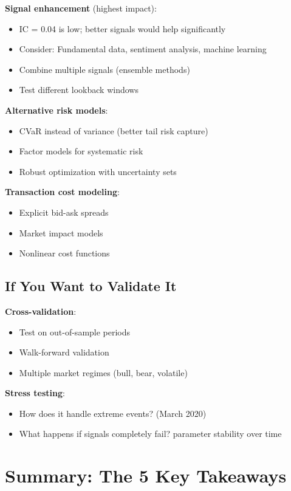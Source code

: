 \documentclass[a4paper,12pt]{article}
\begin{document}
\textbf{Signal enhancement} (highest impact):
\begin{itemize}
    \item IC = 0.04 is low; better signals would help significantly
    \item Consider: Fundamental data, sentiment analysis, machine learning
    \item Combine multiple signals (ensemble methods)
    \item Test different lookback windows
\end{itemize}

\textbf{Alternative risk models}:
\begin{itemize}
    \item CVaR instead of variance (better tail risk capture)
    \item Factor models for systematic risk
    \item Robust optimization with uncertainty sets
\end{itemize}

\textbf{Transaction cost modeling}:
\begin{itemize}
    \item Explicit bid-ask spreads
    \item Market impact models
    \item Nonlinear cost functions
\end{itemize}

\subsection{If You Want to Validate It}

\textbf{Cross-validation}:
\begin{itemize}
    \item Test on out-of-sample periods
    \item Walk-forward validation
    \item Multiple market regimes (bull, bear, volatile)
\end{itemize}

\textbf{Stress testing}:
\begin{itemize}
    \item How does it handle extreme events? (March 2020)
    \item What happens if signals completely fail?
    \test parameter stability over time
\end{itemize}

\section{Summary: The 5 Key Takeaways}
\end{document}
